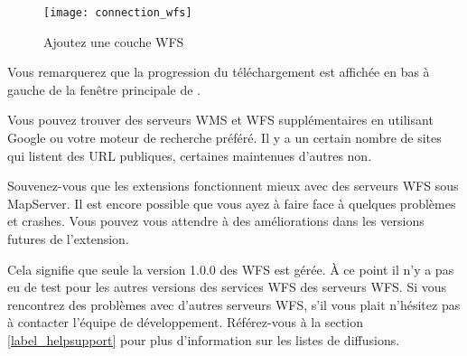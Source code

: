 \begin{figure}[ht]
  \centering
 \texttt{[image: connection\_wfs]}
\caption{Ajoutez une couche WFS\nixcaption}\label{fig:wfs_dmsolutions}
\end{figure}
Vous remarquerez que la progression du téléchargement est affichée en bas à
gauche de la fenêtre principale de \qg.
\begin{Tip}[htb]\caption{\textsc{Trouver des serveurs WMS et WFS}}
Vous pouvez trouver des serveurs WMS et WFS supplémentaires en utilisant
Google ou votre moteur de recherche préféré. Il y a un certain nombre de sites
qui listent des URL publiques, certaines maintenues d'autres non.
\end{Tip}
Souvenez-vous que les extensions fonctionnent mieux avec des serveurs WFS sous
MapServer. Il est encore possible que vous ayez à faire face à quelques
problèmes et crashes. Vous pouvez vous attendre à des améliorations dans les
versions futures de l'extension.

Cela signifie que seule la version 1.0.0 des WFS est gérée. À ce point il n'y a pas eu de test pour les autres versions des services WFS des serveurs WFS.
Si vous rencontrez des problèmes avec d'autres serveurs WFS, s'il vous plait n'hésitez 
pas à contacter l'équipe de développement. Référez-vous à la section 
\ref{label_helpsupport} pour plus d'information sur les listes de diffusions.


